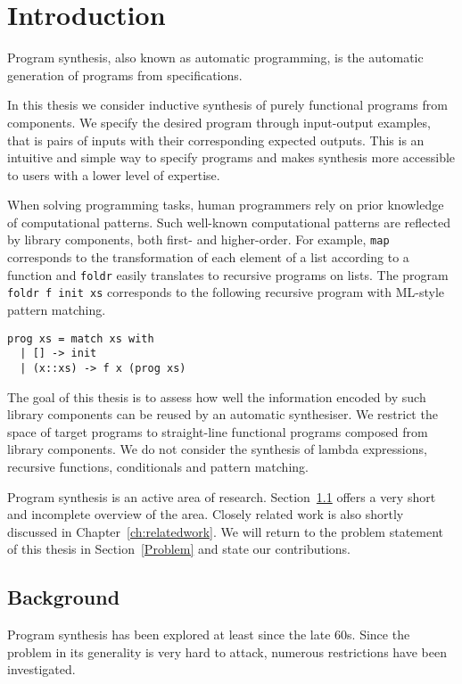 \lstset{style=plain}

\chapter{Introduction}\label{ch:introduction}

Program synthesis, also known as automatic programming, is the automatic generation of programs from specifications.

In this thesis we consider inductive synthesis of purely functional programs from components. We specify the desired program through input-output examples, that is pairs of inputs with their corresponding expected outputs. This is an intuitive and simple way to specify programs and makes synthesis more accessible to users with a lower level of expertise.

When solving programming tasks, human programmers rely on prior knowledge of computational patterns. Such well-known computational patterns are reflected by library components, both first- and higher-order. For example, \lstinline!map! corresponds to the transformation of each element of a list according to a function and \lstinline!foldr! easily translates to recursive programs on lists. The program \lstinline!foldr f init xs! corresponds to the following recursive program with ML-style pattern matching.
\begin{lstlisting}[style=plain]
prog xs = match xs with
  | [] -> init
  | (x::xs) -> f x (prog xs)
\end{lstlisting}
The goal of this thesis is to assess how well the information encoded by such library components can be reused by an automatic synthesiser.
We restrict the space of target programs to straight-line functional programs composed from library components. We do not consider the synthesis of lambda expressions, recursive functions, conditionals and pattern matching.

Program synthesis is an active area of research. Section~\ref{Background} offers a very short and incomplete overview of the area. Closely related work is also shortly discussed in Chapter~\ref{ch:relatedwork}.
We will return to the problem statement of this thesis in Section~\ref{Problem} and state our contributions.

\section{Background}\label{Background}

Program synthesis has been explored at least since the late 60s. Since the problem in its generality is very hard to attack, numerous restrictions have been investigated.

